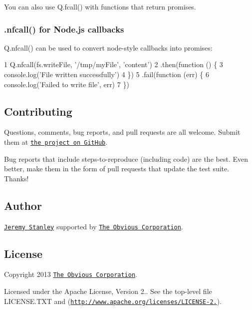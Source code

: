 You can also use {\ttfamily Q.\+fcall()} with functions that return promises.

\subsubsection*{{\ttfamily .nfcall()} for Node.\+js callbacks}

{\ttfamily Q.\+nfcall()} can be used to convert node-\/style callbacks into promises\+:


\begin{DoxyCode}
1 Q.nfcall(fs.writeFile, '/tmp/myFile', 'content')
2   .then(function () \{
3     console.log('File written successfully')
4   \})
5   .fail(function (err) \{
6     console.log('Failed to write file', err)
7   \})
\end{DoxyCode}


\subsection*{Contributing }

Questions, comments, bug reports, and pull requests are all welcome. Submit them at \href{https://github.com/Obvious/kew/}{\tt the project on Git\+Hub}.

Bug reports that include steps-\/to-\/reproduce (including code) are the best. Even better, make them in the form of pull requests that update the test suite. Thanks!

\subsection*{Author }

\href{https://github.com/azulus}{\tt Jeremy Stanley} supported by \href{http://obvious.com/}{\tt The Obvious Corporation}.

\subsection*{License }

Copyright 2013 \href{http://obvious.com/}{\tt The Obvious Corporation}.

Licensed under the Apache License, Version 2.. See the top-\/level file {\ttfamily L\+I\+C\+E\+N\+S\+E.\+T\+X\+T} and (\href{http://www.apache.org/licenses/LICENSE-2.0}{\tt http\+://www.\+apache.\+org/licenses/\+L\+I\+C\+E\+N\+S\+E-\/2.}). 